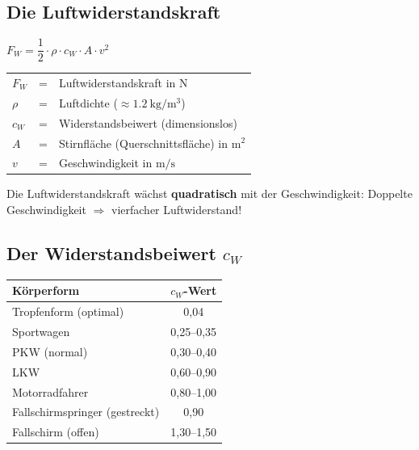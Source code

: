 \documentclass[11pt, a4paper]{article}
\newcommand{\wichtig}[1]{\textcolor{physik}{\textbf{#1}}}
\begin{document}
\subsection{Die Luftwiderstandskraft}

\begin{formelbox}[title=Luftwiderstandskraft]
\begin{center}
{\Large $F_W = \dfrac{1}{2} \cdot \rho \cdot c_W \cdot A \cdot v^2$}
\end{center}
\vspace{0.3em}
\begin{tabular}{lll}
$F_W$ & = & Luftwiderstandskraft in $\si{\newton}$ \\
$\rho$ & = & Luftdichte ($\approx \SI{1,2}{\kilo\gram\per\metre\cubed}$) \\
$c_W$ & = & Widerstandsbeiwert (dimensionslos) \\
$A$ & = & Stirnfläche (Querschnittsfläche) in $\si{\metre\squared}$ \\
$v$ & = & Geschwindigkeit in $\si{\metre\per\second}$ \\
\end{tabular}
\end{formelbox}

\begin{merksatz}
Die Luftwiderstandskraft wächst \wichtig{quadratisch} mit der Geschwindigkeit: Doppelte Geschwindigkeit $\Rightarrow$ vierfacher Luftwiderstand!
\end{merksatz}

\subsection{Der Widerstandsbeiwert $c_W$}

\begin{center}
\begin{tabular}{|l|c|}
\hline
\textbf{Körperform} & \textbf{$c_W$-Wert} \\
\hline
Tropfenform (optimal) & 0,04 \\
Sportwagen & 0,25--0,35 \\
PKW (normal) & 0,30--0,40 \\
LKW & 0,60--0,90 \\
Motorradfahrer & 0,80--1,00 \\
Fallschirmspringer (gestreckt) & 0,90 \\
Fallschirm (offen) & 1,30--1,50 \\
\hline
\end{tabular}
\end{center}
\end{document}

